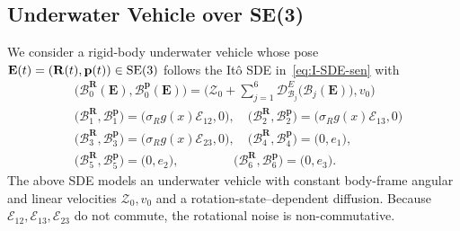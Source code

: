 \documentclass[11pt, a4paper, onecolumn]{article}
\newcommand{\SOn}{\mathrm{SO}(n)}
\newcommand{\bfE}{\bf{E}}
\newcommand{\DE}{\tg D^{E}}
\newcommand{\bfR}{\mathbf{R}}
\newcommand{\Z}{\mathcal{Z}}
\newcommand{\B}{\mathcal{B}}
\renewcommand{\bf}[1]{\mathbf{#1}}
\newcommand{\tg}[1]{\mathcal{#1}}
\newcommand{\Der}[4]{
  #1_{#2}\bigl(#3(#4)\bigr)
}
\begin{document}




\subsection{Underwater Vehicle over SE(3)}
We consider a rigid-body underwater vehicle whose pose $\bfE(t)=(\bfR(t),\bf p(t))\in{\rm SE(3)}$ follows the It\^o SDE in~\eqref{eq:I-SDE-sen} with
\begin{align*}
    &\big(\B_0^{\bfR}(\bfE), \B_0^{\bf p}(\bfE)\big) = \Big( \Z_0+\sum_{j=1}^6 \Der{\DE}{\B_j}{\B_j}{\bfE} , v_0 \Big) \\
    &\big(\B_1^{\bfR},\B_1^{\bf p}\big)=\big(\sigma_R g(x)\tg E_{12}, 0\big),\quad \big(\B_2^{\bfR},\B_2^{\bf p}\big)=\big(\sigma_Rg(x)\tg E_{13}, 0\big) \\
    &\big(\B_3^{\bfR},\B_3^{\bf p}\big)=\big(\sigma_Rg(x)\tg E_{23}, 0\big), \quad \big(\B_4^{\bfR},\B_4^{\bf p}\big)=\big(0 ,e_1\big),\\
    &\big(\B_5^{\bfR},\B_5^{\bf p}\big)=\big(0, e_2\big),\quad \quad  \,\,\,\,\,\,\,\,\,\,\,\,\,\, \big(\B_6^{\bfR},\B_6^{\bf p} \big)=\big(0, e_3\big).
\end{align*}
The above SDE models an underwater vehicle with constant body-frame angular and linear velocities $\Z_0,v_0$ and a rotation-state–dependent diffusion. Because $\tg E_{12},\tg E_{13},\tg E_{23}$ do not commute, the rotational noise is non-commutative.
\end{document}
